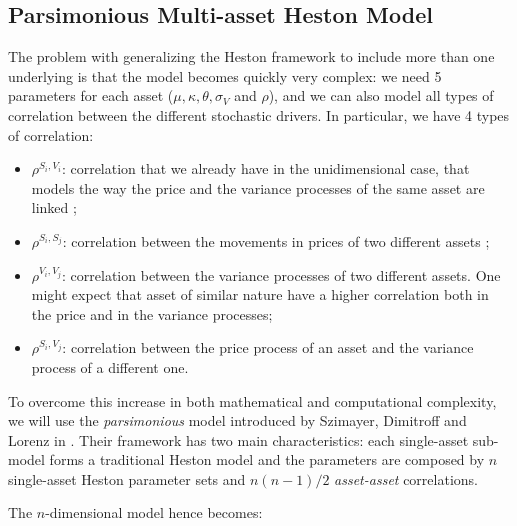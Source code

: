 \subsection{Parsimonious Multi-asset Heston Model}
The problem with generalizing the Heston framework to include more than one underlying is that the model becomes quickly very complex: we need 5 parameters for each asset ($\mu, \kappa,\theta, \sigma_V$ and $ \rho$), and we can also model all types of correlation between the different stochastic drivers. In particular, we have 4 types of correlation: 
\begin{itemize}
	\item $ \rho^{S_i , V_i}$:  correlation that we already have in the unidimensional case, that models the way the price and the variance processes of the same asset are linked ;
	\item $ \rho^{S_i , S_j}$: correlation between the movements in prices of two different assets ;
	\item $\rho^{V_i , V_j} $: correlation between the variance processes of two different assets. One might expect that asset of similar nature have a higher correlation both in the price and in the variance processes;
	\item $\rho^{S_i , V_j} $: correlation between the price process of an asset and the variance process of a different one.
\end{itemize}

To overcome this increase in both mathematical and computational complexity, we will use the \textit{parsimonious} model introduced by Szimayer, Dimitroff and Lorenz in \citep{PARSIMONIOUS2011}. Their framework has two main characteristics: each single-asset sub-model forms a traditional Heston model and the parameters are  composed by $n$ single-asset Heston parameter sets and $n (n-1)/2$  \textit{asset-asset} correlations.

The $n$-dimensional model  hence becomes:


